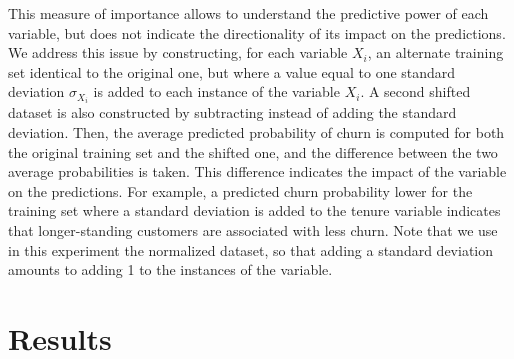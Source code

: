 This measure of importance allows to understand the predictive power of each
variable, but does not indicate the directionality of its impact on the
predictions. We address this issue by constructing, for each variable $X_i$, an
alternate training set identical to the original one, but where a value equal to
one standard deviation $\sigma_{X_i}$ is added to each instance of the variable
$X_i$. A second shifted dataset is also constructed by subtracting instead of
adding the standard deviation. Then, the average predicted probability of churn
is computed for both the original training set and the shifted one, and the
difference between the two average probabilities is taken. This difference
indicates the impact of the variable on the predictions. For example, a
predicted churn probability lower for the training set where a standard
deviation is added to the tenure variable indicates that longer-standing
customers are associated with less churn. Note that we use in this experiment
the normalized dataset, so that adding a standard deviation amounts to adding 1
to the instances of the variable.

\section{Results}

